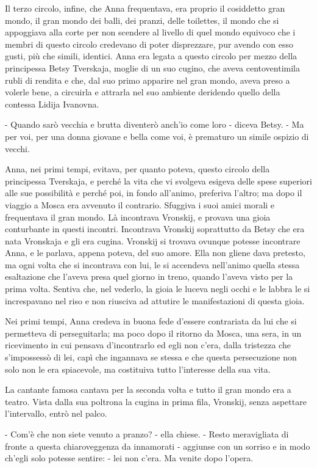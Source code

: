 Il terzo circolo, infine, che Anna frequentava, era proprio il cosiddetto gran mondo, il gran mondo dei balli, dei pranzi, delle toilettes, il mondo che si appoggiava alla corte per non scendere al livello di quel mondo equivoco che i membri di questo circolo credevano di poter disprezzare, pur avendo con esso gusti, più che simili, identici. Anna era legata a questo circolo per mezzo della principessa Betsy Tverskaja, moglie di un suo cugino, che aveva centoventimila rubli di rendita e che, dal suo primo apparire nel gran mondo, aveva preso a volerle bene, a circuirla e attrarla nel suo ambiente deridendo quello della contessa Lidija Ivanovna. 

- Quando sarò vecchia e brutta diventerò anch'io come loro - diceva Betsy. - Ma per voi, per una donna giovane e bella come voi, è prematuro un simile ospizio di vecchi. 

Anna, nei primi tempi, evitava, per quanto poteva, questo circolo della principessa Tverskaja, e perché la vita che vi svolgeva esigeva delle spese superiori alle sue possibilità e perché poi, in fondo all'animo, preferiva l'altro; ma dopo il viaggio a Mosca era avvenuto il contrario. Sfuggiva i suoi amici morali e frequentava il gran mondo. Là incontrava Vronskij, e provava una gioia conturbante in questi incontri. Incontrava Vronskij soprattutto da Betsy che era nata Vronskaja e gli era cugina. Vronskij si trovava ovunque potesse incontrare Anna, e le parlava, appena poteva, del suo amore. Ella non gliene dava pretesto, ma ogni volta che si incontrava con lui, le si accendeva nell'animo quella stessa esaltazione che l'aveva presa quel giorno in treno, quando l'aveva visto per la prima volta. Sentiva che, nel vederlo, la gioia le luceva negli occhi e le labbra le si increspavano nel riso e non riusciva ad attutire le manifestazioni di questa gioia. 

Nei primi tempi, Anna credeva in buona fede d'essere contrariata da lui che si permetteva di perseguitarla; ma poco dopo il ritorno da Mosca, una sera, in un ricevimento in cui pensava d'incontrarlo ed egli non c'era, dalla tristezza che s'impossessò di lei, capì che ingannava se stessa e che questa persecuzione non solo non le era spiacevole, ma costituiva tutto l'interesse della sua vita. 

La cantante famosa cantava per la seconda volta e tutto il gran mondo era a teatro. Vista dalla sua poltrona la cugina in prima fila, Vronskij, senza aspettare l'intervallo, entrò nel palco. 

- Com'è che non siete venuto a pranzo? - ella chiese. - Resto meravigliata di fronte a questa chiaroveggenza da innamorati - aggiunse con un sorriso e in modo ch'egli solo potesse sentire: - lei non c'era. Ma venite dopo l'opera. 

